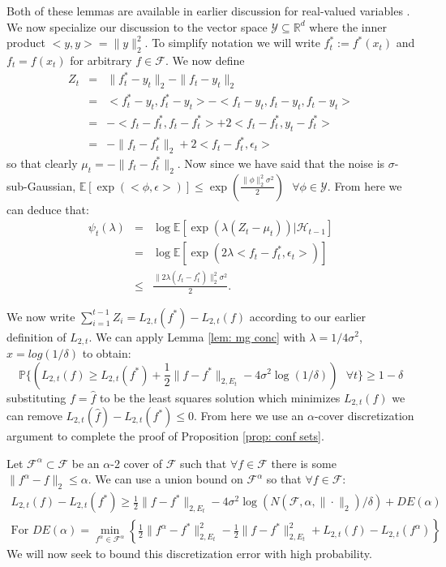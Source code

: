 \documentclass{article}
\newcommand{\Exp}{\mathds{E}}
\newcommand{\Prob}{\mathds{P}}
\newcommand{\Real}{\mathds{R}}
\newcommand{\Yc}{\mathcal{Y}}
\newcommand{\Fc}{\mathcal{F}}
\begin{document}
Both of these lemmas are available in earlier discussion for real-valued variables \cite{russo2013}.
We now specialize our discussion to the vector space $\Yc \subseteq \Real^d$ where the inner product $<y,y> = \|y \|_2^2$.
To simplify notation we will write $f^*_t := f^*(x_t)$ and $f_t = f(x_t)$ for arbitrary $f\in \Fc$.
We now define
\begin{eqnarray*}
	Z_t &=& \|f_t^* - y_t \|_2 - \| f_t - y_t \|_2 \\
	&=& <f_t^* - y_t, f_t^* - y_t> - <f_t - y_t, f_t - y_t, f_t - y_t> \\
	&=& -<f_t - f_t^*, f_t - f_t^*> + 2<f_t - f_t^*, y_t-f_t^*> \\
	&=& - \|f_t - f_t^* \|_2 + 2<f_t - f_t^*, \epsilon_t>
\end{eqnarray*}
so that clearly $\mu_t = - \|f_t - f_t^* \|_2$.
Now since we have said that the noise is $\sigma$-sub-Gaussian,
$ \Exp [ \exp \left( < \phi, \epsilon > \right) ] \le \exp \left( \frac{ \| \phi \|_2^2 \sigma^2}{2} \right)
\text{ } \forall \phi \in \mathcal{Y}$.
From here we can deduce that:
\begin{eqnarray*}
	\psi_t(\lambda) &=& \log \Exp [ \exp \left(\lambda ( Z_t -\mu_t)\right) | \mathcal{H}_{t-1} ]  \\
	&=& \log \Exp[ \exp (2 \lambda <f_t - f_t^*, \epsilon_t>)] \\
	&\le& \frac{\|2 \lambda (f_t - f_t^*) \|_2^2 \sigma^2}{2}.
\end{eqnarray*}

We now write $\sum_{i=1}^{t-1} Z_i = L_{2,t}(f^*) - L_{2,t}(f)$ according to our earlier definition of $L_{2,t}$.
We can apply Lemma \ref{lem: mg conc} with $\lambda = 1/{4\sigma^2}$, $x=log(1/\delta)$ to obtain:
$$ \Prob \{ \left( L_{2,t}(f) \ge L_{2,t}(f^*) + \frac{1}{2} \| f- f^*\|_{2,E_t} - 4\sigma^2\log(1/\delta) \right) \text{ } \forall t \} \ge 1-\delta$$
substituting $f = \hat{f}$ to be the least squares solution which minimizes $L_{2,t}(f)$ we can remove $L_{2,t}(\hat{f}) - L_{2,t}(f^*) \le 0$.
From here we use an $\alpha$-cover discretization argument to complete the proof of Proposition \ref{prop: conf sets}.

Let $\mathcal{F}^\alpha \subset \mathcal{F}$ be an $\alpha$-2 cover of $\mathcal{F}$
such that $\forall f \in \mathcal{F}$ there is some $ \| f^\alpha - f \|_2 \le \alpha$.
We can use a union bound on $\mathcal{F}^\alpha$ so that $\forall f \in \mathcal{F}$:
\begin{eqnarray}
\label{eq: L err bounds}
	L_{2,t}(f) - L_{2,t}(f^*) \ge \frac{1}{2} \|f-f^*\|_{2,E_t} - 4\sigma^2\log(N(\mathcal{F},\alpha,\|\cdot\|_2)/\delta) + DE(\alpha) \\
	\text{For } DE(\alpha) = \min_{f^\alpha \in \Fc^\alpha} \left\{ \frac{1}{2} \|f^\alpha-f^*\|_{2,E_t}^2 -
	\frac{1}{2} \| f-f^* \|_{2,E_t}^2 + L_{2,t}(f) - L_{2,t}(f^\alpha) \right\} \nonumber
\end{eqnarray}
We will now seek to bound this discretization error with high probability.
\end{document}
